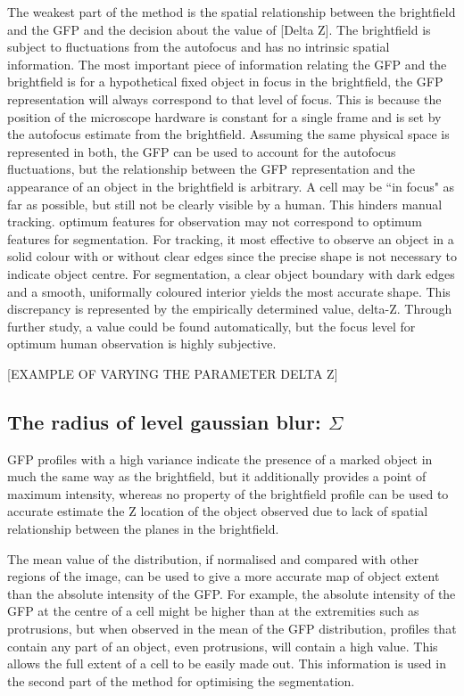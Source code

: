 The weakest part of the method is the spatial relationship between the brightfield and the GFP and the decision about the value of [Delta Z]. The brightfield is subject to fluctuations from the autofocus and has no intrinsic spatial information. The most important piece of information relating the GFP and the brightfield is for a hypothetical fixed object in focus in the brightfield, the GFP representation will always correspond to that level of focus. This is because the position of the microscope hardware is constant for a single frame and is set by the autofocus estimate from the brightfield. Assuming the same physical space is represented in both, the GFP can be used to account for the autofocus fluctuations, but the relationship between the GFP representation and the appearance of an object in the brightfield is arbitrary. A cell may be ``in focus" as far as possible, but still not be clearly visible by a human. This hinders manual tracking. optimum features for observation may not correspond to optimum features for segmentation. For tracking, it most effective to observe an object in a solid colour with or without clear edges since the precise shape is not necessary to indicate object centre. For segmentation, a clear object boundary with dark edges and a smooth, uniformally coloured interior yields the most accurate shape. This discrepancy is represented by the empirically determined value, delta-Z. Through further study, a value could be found automatically, but the focus level for optimum human observation is highly subjective.

[EXAMPLE OF VARYING THE PARAMETER DELTA Z]

\subsection{The radius of level gaussian blur: $\Sigma$}

GFP profiles with a high variance indicate the presence of a marked object in much the same way as the brightfield, but it additionally provides a point of maximum intensity, whereas no property of the brightfield profile can be used to accurate estimate the Z location of the object observed due to lack of spatial relationship between the planes in the brightfield.

The mean value of the distribution, if normalised and compared with other regions of the image, can be used to give a more accurate map of object extent than the absolute intensity of the GFP. For example, the absolute intensity of the GFP at the centre of a cell might be higher than at the extremities such as protrusions, but when observed in the mean of the GFP distribution, profiles that contain any part of an object, even protrusions, will contain a high value. This allows the full extent of a cell to be easily made out. This information is used in the second part of the method for optimising the segmentation.

